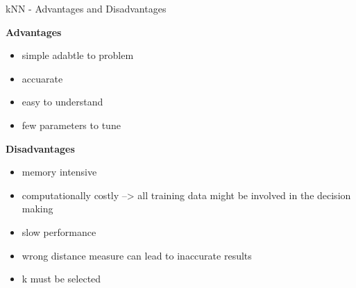 \documentclass[11pt,compress,t,notes=noshow, xcolor=table]{beamer}
\begin{document}
\begin{frame}{kNN - Advantages and Disadvantages}

\textbf{Advantages}
\begin{itemize}
\item simple adabtle to problem 
\item accuarate
\item easy to understand
\item few parameters to tune
\end{itemize}


\textbf{Disadvantages}
\begin{itemize}
\item memory intensive
\item computationally costly --> all training data might be involved in the decision making
\item slow performance
\item wrong distance measure can lead to inaccurate results 
\item k must be selected
\end{itemize}
\end{frame}

\endlecture
\end{document}
